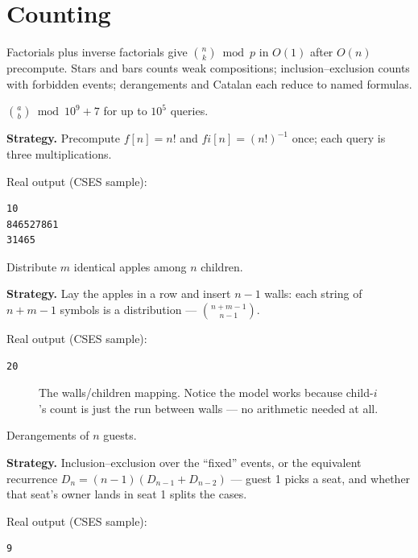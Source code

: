 \section{Counting}\label{sec:counting}
Factorials plus inverse factorials give $\binom{n}{k} \bmod p$ in
$O(1)$ after $O(n)$ precompute. Stars and bars counts weak
compositions; inclusion--exclusion counts with forbidden events;
derangements and Catalan each reduce to named formulas.
\begin{example}\label{ex:bincoef}
$\binom{a}{b} \bmod 10^9{+}7$ for up to $10^5$ queries.
\par\smallskip
\textbf{Strategy.} Precompute $f[n]=n!$ and $fi[n]=(n!)^{-1}$ once;
each query is three multiplications.
\par\smallskip
\begin{solution}

Real output (CSES sample):
\begin{lstlisting}[numbers=none]
10
846527861
31465
\end{lstlisting}
\end{solution}
\end{example}
\begin{example}\label{ex:apples}
Distribute $m$ identical apples among $n$ children.
\par\smallskip
\textbf{Strategy.} Lay the apples in a row and insert $n{-}1$
walls: each string of $n{+}m{-}1$ symbols is a distribution ---
$\binom{n+m-1}{n-1}$.
\par\smallskip
\begin{solution}

Real output (CSES sample):
\begin{lstlisting}[numbers=none]
20
\end{lstlisting}
\end{solution}
\end{example}
\begin{figure}[ht]\centering

\caption{The walls/children mapping. Notice the model works because
child-$i$'s count is just the run between walls --- no arithmetic
needed at all.}
\label{fig:starsbars}
\end{figure}
\begin{example}\label{ex:christmas}
Derangements of $n$ guests.
\par\smallskip
\textbf{Strategy.} Inclusion--exclusion over the ``fixed'' events,
or the equivalent recurrence
$D_n=(n-1)(D_{n-1}+D_{n-2})$ --- guest 1 picks a seat, and whether
that seat's owner lands in seat 1 splits the cases.
\par\smallskip
\begin{solution}

Real output (CSES sample):
\begin{lstlisting}[numbers=none]
9
\end{lstlisting}
\end{solution}
\end{example}
